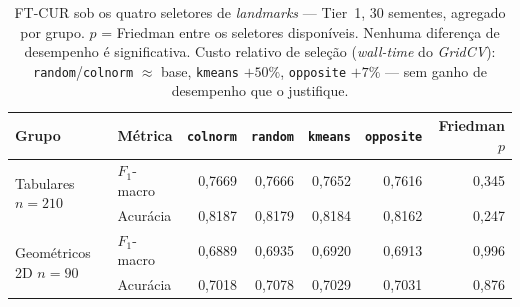 \begin{table}[ht]
  \centering
  \caption{FT-CUR sob os quatro seletores de \emph{landmarks} --- Tier~1, 30 sementes, agregado por grupo. $p$ = Friedman entre os seletores disponíveis. Nenhuma diferença de desempenho é significativa. Custo relativo de seleção (\emph{wall-time} do \textit{GridCV}): \texttt{random}/\texttt{colnorm} $\approx$ base, \texttt{kmeans} $+50\%$, \texttt{opposite} $+7\%$ --- sem ganho de desempenho que o justifique.}
  \label{tab:app_ftcur_selection}
  \begin{tabular}{llrrrrr}
    \toprule
    Grupo & Métrica & \texttt{colnorm} & \texttt{random} & \texttt{kmeans} & \texttt{opposite} & Friedman $p$ \\
    \midrule
    \multirow{2}{*}{Tabulares $n{=}210$} & $F_1$-macro & 0,7669 & 0,7666 & 0,7652 & 0,7616 & 0,345 \\
     & Acurácia & 0,8187 & 0,8179 & 0,8184 & 0,8162 & 0,247 \\
    \midrule
    \multirow{2}{*}{Geométricos 2D $n{=}90$} & $F_1$-macro & 0,6889 & 0,6935 & 0,6920 & 0,6913 & 0,996 \\
     & Acurácia & 0,7018 & 0,7078 & 0,7029 & 0,7031 & 0,876 \\
    \bottomrule
  \end{tabular}
\end{table}
